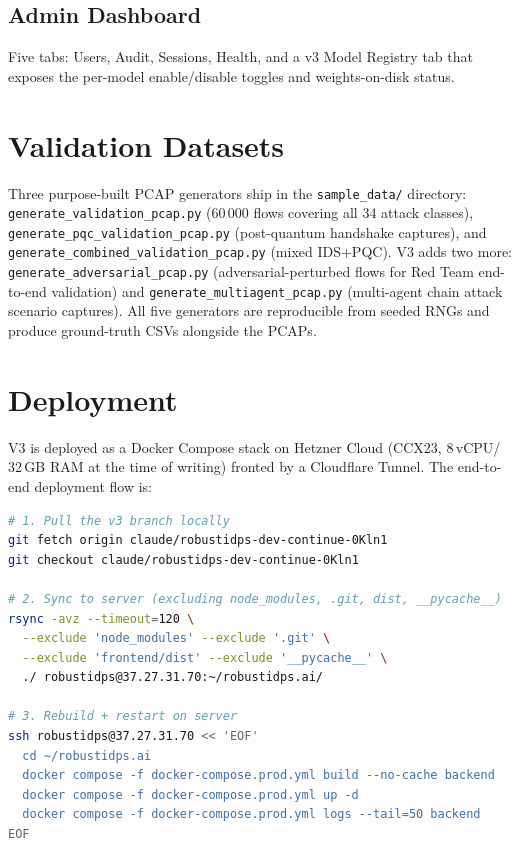 \documentclass[11pt,a4paper]{article}
\begin{document}
\subsection{Admin Dashboard}
Five tabs: Users, Audit, Sessions, Health, and a v3 Model Registry
tab that exposes the per-model enable/disable toggles and
weights-on-disk status.

\section{Validation Datasets}
\label{sec:datasets}

Three purpose-built PCAP generators ship in the
\texttt{sample\_data/} directory:
\texttt{generate\_validation\_pcap.py} (60\,000 flows covering all 34
attack classes), \texttt{generate\_pqc\_validation\_pcap.py}
(post-quantum handshake captures), and
\texttt{generate\_combined\_validation\_pcap.py} (mixed IDS+PQC).
V3 adds two more:
\texttt{generate\_adversarial\_pcap.py} (adversarial-perturbed flows
for Red Team end-to-end validation) and
\texttt{generate\_multiagent\_pcap.py} (multi-agent chain attack
scenario captures).  All five generators are reproducible from
seeded RNGs and produce ground-truth CSVs alongside the PCAPs.

\section{Deployment}
\label{sec:deployment}

V3 is deployed as a Docker Compose stack on Hetzner Cloud (CCX23,
$8\,$vCPU/$32\,$GB RAM at the time of writing) fronted by a
Cloudflare Tunnel.  The end-to-end deployment flow is:

\begin{lstlisting}[language=bash]
# 1. Pull the v3 branch locally
git fetch origin claude/robustidps-dev-continue-0Kln1
git checkout claude/robustidps-dev-continue-0Kln1

# 2. Sync to server (excluding node_modules, .git, dist, __pycache__)
rsync -avz --timeout=120 \
  --exclude 'node_modules' --exclude '.git' \
  --exclude 'frontend/dist' --exclude '__pycache__' \
  ./ robustidps@37.27.31.70:~/robustidps.ai/

# 3. Rebuild + restart on server
ssh robustidps@37.27.31.70 << 'EOF'
  cd ~/robustidps.ai
  docker compose -f docker-compose.prod.yml build --no-cache backend
  docker compose -f docker-compose.prod.yml up -d
  docker compose -f docker-compose.prod.yml logs --tail=50 backend
EOF
\end{lstlisting}
\end{document}

